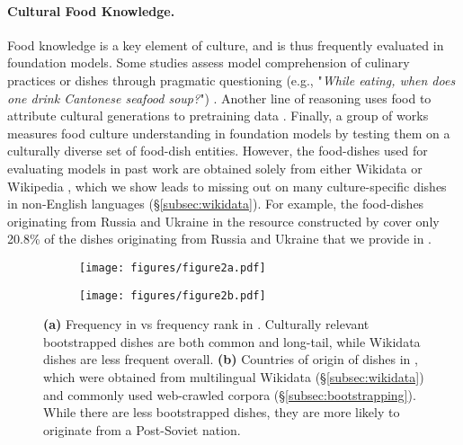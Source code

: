 \paragraph{Cultural Food Knowledge.}
Food knowledge is a key element of culture, and is thus frequently evaluated in foundation models. Some studies assess model comprehension of culinary practices or dishes through pragmatic questioning (e.g., "\textit{While eating, when does one drink Cantonese seafood soup?}") \cite{palta2023fork, yao2023benchmarking, putri2024can, li2024foodieqamultimodaldatasetfinegrained}. Another line of reasoning uses food to attribute cultural generations to pretraining data \cite{li2024attributingcultureconditionedgenerationspretraining}.
Finally, a group of works measures food culture understanding in foundation models by testing them on a culturally diverse set of food-dish entities. However, the food-dishes used for evaluating models in past work are obtained solely from either Wikidata \cite{zhou2024does} or Wikipedia \cite{winata2024worldcuisines}, which we show leads to missing out on many culture-specific dishes in non-English languages (\S\ref{subsec:wikidata}). For example, the food-dishes originating from Russia and Ukraine in the resource constructed by \citet{winata2024worldcuisines} cover only 20.8\% of the dishes originating from Russia and Ukraine that we provide in \benchmarkname{}.

\begin{figure*}[t]
    \centering
    \begin{subfigure}[t]{0.333\linewidth}
        \centering
        \texttt{[image: figures/figure2a.pdf]}
        \caption{}
        \label{fig:figure2a}
    \end{subfigure}%
    \hfill
    \begin{subfigure}[t]{0.666\linewidth}
        \centering
        \texttt{[image: figures/figure2b.pdf]}
        \caption{}
        \label{fig:figure2b}
    \end{subfigure}
\caption{
        \textbf{(a)} Frequency in  vs frequency rank in \benchmarkname{}. Culturally relevant bootstrapped dishes are both common and long-tail, while Wikidata dishes are less frequent overall. \textbf{(b)} Countries of origin of dishes in \benchmarkname{}, which were obtained from multilingual Wikidata  (\S\ref{subsec:wikidata}) and commonly used web-crawled corpora (\S\ref{subsec:bootstrapping}). While there are less bootstrapped dishes, they are more likely to originate from a Post-Soviet nation.
    }
    \vspace{-0.3cm}
    \label{fig:map_comparisons}
\end{figure*}


